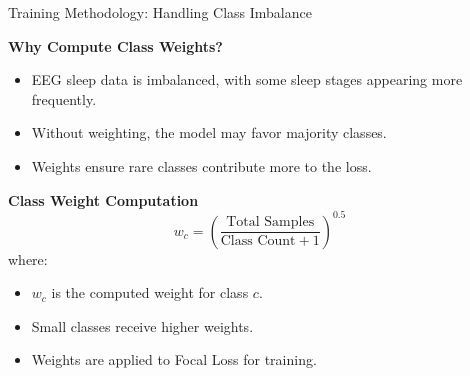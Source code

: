 \begin{frame}{Training Methodology: Handling Class Imbalance}

    \textbf{\large Why Compute Class Weights?}
    \vspace{5pt}
    \begin{itemize}
        \item EEG sleep data is imbalanced, with some sleep stages appearing more frequently.
        \item Without weighting, the model may favor majority classes.
        \item Weights ensure rare classes contribute more to the loss.
    \end{itemize}

    \vspace{10pt}
    \textbf{\large Class Weight Computation}
    \vspace{5pt}
    \[
    w_c = \left( \frac{\text{Total Samples}}{\text{Class Count} + 1} \right)^{0.5}
    \]
    where:
    \begin{itemize}
        \item \( w_c \) is the computed weight for class \( c \).
        \item Small classes receive higher weights.
        \item Weights are applied to Focal Loss for training.
    \end{itemize}

\end{frame}




 